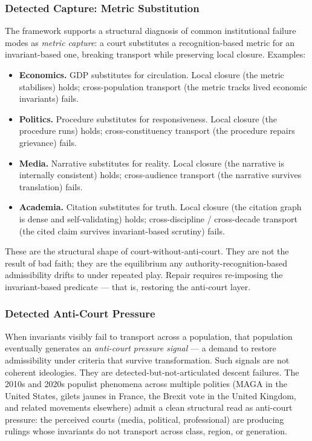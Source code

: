 \documentclass[
]{article}
\providecommand{\tightlist}{%
  \setlength{\itemsep}{0pt}\setlength{\parskip}{0pt}}
\begin{document}
\subsubsection{Detected Capture: Metric
Substitution}\label{detected-capture-metric-substitution}

The framework supports a structural diagnosis of common
institutional failure modes as \emph{metric capture}: a court
substitutes a recognition-based metric for an invariant-based one,
breaking transport while preserving local closure. Examples:
\begin{itemize}
\tightlist
\item
  \textbf{Economics.} GDP substitutes for circulation. Local
  closure (the metric stabilises) holds; cross-population transport
  (the metric tracks lived economic invariants) fails.
\item
  \textbf{Politics.} Procedure substitutes for responsiveness.
  Local closure (the procedure runs) holds; cross-constituency
  transport (the procedure repairs grievance) fails.
\item
  \textbf{Media.} Narrative substitutes for reality. Local closure
  (the narrative is internally consistent) holds; cross-audience
  transport (the narrative survives translation) fails.
\item
  \textbf{Academia.} Citation substitutes for truth. Local closure
  (the citation graph is dense and self-validating) holds;
  cross-discipline / cross-decade transport (the cited claim
  survives invariant-based scrutiny) fails.
\end{itemize}

These are the structural shape of court-without-anti-court. They
are not the result of bad faith; they are the equilibrium any
authority-recognition-based admissibility drifts to under repeated
play. Repair requires re-imposing the invariant-based predicate
--- that is, restoring the anti-court layer.

\subsubsection{Detected Anti-Court
Pressure}\label{detected-anti-court-pressure}

When invariants visibly fail to transport across a population,
that population eventually generates an \emph{anti-court pressure
signal} --- a demand to restore admissibility under criteria that
survive transformation. Such signals are not coherent ideologies.
They are detected-but-not-articulated descent failures. The 2010s
and 2020s populist phenomena across multiple polities (MAGA in the
United States, gilets jaunes in France, the Brexit vote in the
United Kingdom, and related movements elsewhere) admit a clean
structural read as anti-court pressure: the perceived courts
(media, political, professional) are producing rulings whose
invariants do not transport across class, region, or generation.
\end{document}
